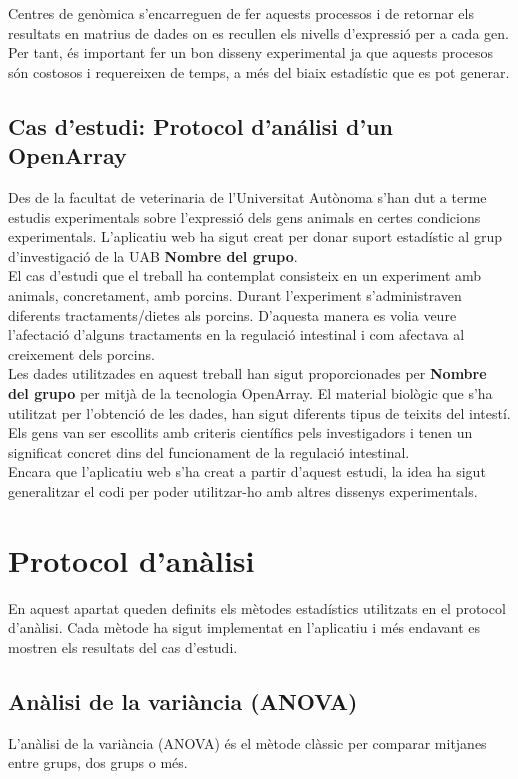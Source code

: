 \documentclass[english]{article}
\begin{document}
Centres de genòmica s'encarreguen de fer aquests processos i de retornar els resultats en matrius de dades on es recullen els nivells d'expressió per a cada gen. Per tant, és important fer un bon disseny experimental ja que aquests procesos són costosos i requereixen de temps, a més del biaix estadístic que es pot generar.


\subsection{Cas d'estudi: Protocol d'análisi d'un OpenArray}
Des de la facultat de veterinaria de l'Universitat Autònoma s'han dut a terme estudis experimentals sobre l'expressió dels gens animals en certes condicions experimentals. L'aplicatiu web ha sigut creat per donar suport estadístic al grup d'investigació de la UAB \textbf{Nombre del grupo}.
\\

El cas d'estudi que el treball ha contemplat consisteix en un experiment amb animals, concretament, amb porcins. Durant l'experiment s'administraven diferents tractaments/dietes als porcins. D'aquesta manera es volia veure l'afectació d'alguns tractaments en la regulació intestinal i com afectava al creixement dels porcins.
\\

Les dades utilitzades en aquest treball han sigut proporcionades per \textbf{Nombre del grupo} per mitjà de la tecnologia OpenArray. El material biològic que s'ha utilitzat per l'obtenció de les dades, han sigut diferents tipus de teixits del intestí. Els gens van ser escollits amb criteris científics pels investigadors i tenen un significat concret dins del funcionament de la regulació intestinal.
\\

Encara que l'aplicatiu web s'ha creat a partir d'aquest estudi, la idea ha sigut generalitzar el codi per poder utilitzar-ho amb altres dissenys experimentals.

\section{Protocol d'anàlisi}
En aquest apartat queden definits els mètodes estadístics utilitzats en el protocol d'anàlisi. Cada mètode ha sigut implementat en l'aplicatiu i més endavant es mostren els resultats del cas d'estudi.
\subsection{Anàlisi de la variància (ANOVA)}
L'anàlisi de la variància (ANOVA) és el mètode clàssic per comparar mitjanes entre grups, dos grups o més.
\\
\end{document}
